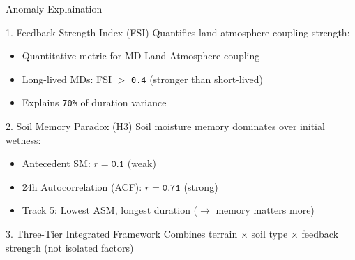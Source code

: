 \begin{frame}{Anomaly Explaination}
	\vspace{-0.2cm}
	\footnotesize
	\begin{block}{1. Feedback Strength Index (FSI)}
		Quantifies land-atmosphere coupling strength:
		\begin{itemize}\footnotesize
			\item Quantitative metric for MD Land-Atmosphere coupling
			\item Long-lived MDs: FSI $>$ \texttt{0.4} (stronger than short-lived)
			\item Explains \texttt{70\%} of duration variance
		\end{itemize}
	\end{block}

	\begin{block}{2. Soil Memory Paradox (H3)}
		Soil moisture memory dominates over initial wetness:
		\begin{itemize}\footnotesize
			\item Antecedent SM: $r = \texttt{0.1}$ (weak)
			\item 24h Autocorrelation (ACF): $r = \texttt{0.71}$ (strong)
			\item Track 5: Lowest ASM, longest duration ($\rightarrow$ memory matters more)
		\end{itemize}
	\end{block}

	\begin{block}{3. Three-Tier Integrated Framework}
		Combines terrain $\times$ soil type $\times$ feedback strength (not isolated factors)
	\end{block}
\end{frame}

